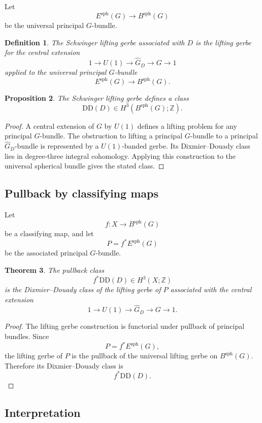 \documentclass[11pt]{amsart}
\newtheorem{definition}{Definition}[section]
\newtheorem{theorem}[definition]{Theorem}
\newtheorem{proposition}[definition]{Proposition}
\begin{document}
Let
\[
E^{\mathrm{sph}}(G)\to B^{\mathrm{sph}}(G)
\]
be the universal principal \(G\)-bundle.

\begin{definition}
The \emph{Schwinger lifting gerbe} associated with \(D\) is the lifting gerbe
for the central extension
\[
1
\to
U(1)
\to
\widehat G_D
\to
G
\to
1
\]
applied to the universal principal \(G\)-bundle
\[
E^{\mathrm{sph}}(G)\to B^{\mathrm{sph}}(G).
\]
\end{definition}

\begin{proposition}
The Schwinger lifting gerbe defines a class
\[
\mathrm{DD}(D)
\in
H^3(B^{\mathrm{sph}}(G);\mathbb Z).
\]
\end{proposition}

\begin{proof}
A central extension of \(G\) by \(U(1)\) defines a lifting problem for any
principal \(G\)-bundle. The obstruction to lifting a principal \(G\)-bundle to
a principal \(\widehat G_D\)-bundle is represented by a \(U(1)\)-banded gerbe.
Its Dixmier--Douady class lies in degree-three integral cohomology. Applying
this construction to the universal spherical bundle gives the stated class.
\end{proof}

\subsection{Pullback by classifying maps}

Let
\[
f:X\to B^{\mathrm{sph}}(G)
\]
be a classifying map, and let
\[
P=f^*E^{\mathrm{sph}}(G)
\]
be the associated principal \(G\)-bundle.

\begin{theorem}
The pullback class
\[
f^*\mathrm{DD}(D)
\in
H^3(X;\mathbb Z)
\]
is the Dixmier--Douady class of the lifting gerbe of \(P\) associated with the
central extension
\[
1\to U(1)\to \widehat G_D\to G\to 1.
\]
\end{theorem}

\begin{proof}
The lifting gerbe construction is functorial under pullback of principal
bundles. Since
\[
P=f^*E^{\mathrm{sph}}(G),
\]
the lifting gerbe of \(P\) is the pullback of the universal lifting gerbe on
\(B^{\mathrm{sph}}(G)\). Therefore its Dixmier--Douady class is
\[
f^*\mathrm{DD}(D).
\]
\end{proof}

\subsection{Interpretation}
\end{document}
